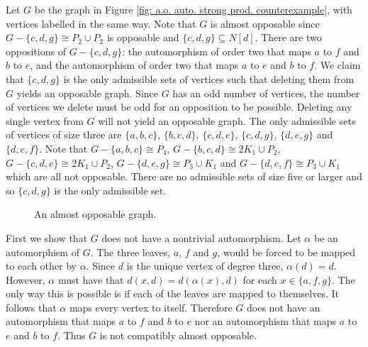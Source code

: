 \documentclass[11pt]{article}
\theoremstyle{definition}
\begin{document}
Let $G$ be the graph in Figure \ref{fig: a.o. auto. strong prod.
counterexample}, with vertices labelled in the same way. Note that $G$ is
almost opposable since $G - \{c,d,g\} \cong P_2 \cup P_2$ is opposable and
$\{c,d,g\} \subseteq N[d]$. There are two oppositions of $G - \{c,d,g\}$: the
automorphism of order two that maps $a$ to $f$ and $b$ to $e$, and the
automorphism of order two that maps $a$ to $e$ and $b$ to $f$. We claim that
$\{c,d,g\}$ is the only admissible sets of vertices such that deleting them
from $G$ yields an opposable graph. Since $G$ has an odd number of vertices,
the number of vertices we delete must be odd for an opposition to be possible.
Deleting any single vertex from $G$ will not yield an opposable graph. The only
admissible sets of vertices of size three are $\{a,b,c\}$, $\{b,c,d\}$,
$\{c,d,e\}$, $\{c,d,g\}$, $\{d,e,g\}$ and $\{d,e,f\}$. Note that $G-\{a,b,c\}
\cong P_4$, $G-\{b,c,d\} \cong 2K_1 \cup P_2$, $G-\{c,d,e\} \cong 2K_1 \cup
P_2$, $G-\{d,e,g\} \cong P_3 \cup K_1$ and $G-\{d,e,f\} \cong P_3 \cup K_1$
which are all not opposable. There are no admissible sets of size five or
larger and so $\{c,d,g\}$ is the only admissible set. 

\begin{figure}
    \centering
    \caption{An almost opposable graph.}
    \label{fig: a.o. auto. strong prod. counterexample}
\end{figure}

First we show that $G$ does not have a nontrivial automorphism. Let $\alpha$ be
an automorphism of $G$. The three leaves, $a$, $f$ and $g$, would be forced to
be mapped to each other by $\alpha$. Since $d$ is the unique vertex of degree
three, $\alpha(d) = d$. However, $\alpha$ must have that $d(x,d) = d(\alpha(x),
d)$ for each $x\in \{a,f,g\}$. The only way this is possible is if each of the
leaves are mapped to themselves. It follows that $\alpha$ maps every vertex to
itself. Therefore $G$ does not have an automorphism that maps $a$ to $f$ and
$b$ to $e$ nor an automorphism that maps $a$ to $e$ and $b$ to $f$. Thus $G$ is
not compatibly almost opposable. 
\end{document}
